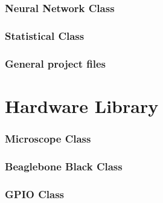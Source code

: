 \documentclass[11pt,fleqn,,a4paper,twoside,openright]{book}
\begin{document}
\subsection*{Neural Network Class}


\newpage
\subsection*{Statistical Class}


\newpage
\subsection*{General project files}









\chapter{Hardware Library}
\subsection*{Microscope Class}


\newpage
\subsection*{Beaglebone Black Class}


\newpage
\subsection*{GPIO Class}


\newpage
\end{document}
